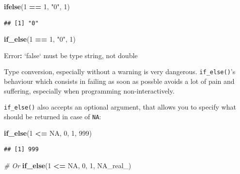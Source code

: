 \documentclass[]{gitbook}
\newenvironment{Shaded}{\begin{snugshade}}{\end{snugshade}}
\newcommand{\CommentTok}[1]{\textcolor[rgb]{0.56,0.35,0.01}{\textit{#1}}}
\newcommand{\DataTypeTok}[1]{\textcolor[rgb]{0.13,0.29,0.53}{#1}}
\newcommand{\DecValTok}[1]{\textcolor[rgb]{0.00,0.00,0.81}{#1}}
\newcommand{\KeywordTok}[1]{\textcolor[rgb]{0.13,0.29,0.53}{\textbf{#1}}}
\newcommand{\NormalTok}[1]{#1}
\newcommand{\OperatorTok}[1]{\textcolor[rgb]{0.81,0.36,0.00}{\textbf{#1}}}
\newcommand{\OtherTok}[1]{\textcolor[rgb]{0.56,0.35,0.01}{#1}}
\newcommand{\StringTok}[1]{\textcolor[rgb]{0.31,0.60,0.02}{#1}}
\begin{document}
\begin{Shaded}
\begin{Highlighting}[]
\KeywordTok{ifelse}\NormalTok{(}\DecValTok{1} \OperatorTok{==}\StringTok{ }\DecValTok{1}\NormalTok{, }\StringTok{"0"}\NormalTok{, }\DecValTok{1}\NormalTok{)}
\end{Highlighting}
\end{Shaded}

\begin{verbatim}
## [1] "0"
\end{verbatim}

\begin{Shaded}
\begin{Highlighting}[]
\KeywordTok{if_else}\NormalTok{(}\DecValTok{1} \OperatorTok{==}\StringTok{ }\DecValTok{1}\NormalTok{, }\StringTok{"0"}\NormalTok{, }\DecValTok{1}\NormalTok{)}
\end{Highlighting}
\end{Shaded}

\begin{Shaded}
\begin{Highlighting}[]
\NormalTok{Error}\OperatorTok{:}\StringTok{ `}\DataTypeTok{false}\StringTok{`}\NormalTok{ must be type string, not double}
\end{Highlighting}
\end{Shaded}

Type conversion, especially without a warning is very dangerous. \texttt{if\_else()}'s behaviour which
consists in failing as soon as possble avoids a lot of pain and suffering, especially when
programming non-interactively.

\texttt{if\_else()} also accepts an optional argument, that allows you to specify what should be returned
in case of \texttt{NA}:

\begin{Shaded}
\begin{Highlighting}[]
\KeywordTok{if_else}\NormalTok{(}\DecValTok{1} \OperatorTok{<=}\StringTok{ }\OtherTok{NA}\NormalTok{, }\DecValTok{0}\NormalTok{, }\DecValTok{1}\NormalTok{, }\DecValTok{999}\NormalTok{)}
\end{Highlighting}
\end{Shaded}

\begin{verbatim}
## [1] 999
\end{verbatim}

\begin{Shaded}
\begin{Highlighting}[]
\CommentTok{# Or}
\KeywordTok{if_else}\NormalTok{(}\DecValTok{1} \OperatorTok{<=}\StringTok{ }\OtherTok{NA}\NormalTok{, }\DecValTok{0}\NormalTok{, }\DecValTok{1}\NormalTok{, }\OtherTok{NA_real_}\NormalTok{)}
\end{Highlighting}
\end{Shaded}
\end{document}

